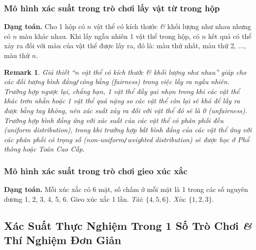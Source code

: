 \documentclass{article}
\numberwithin{equation}{section}
\newtheorem{remark}{Remark}[section]
\begin{document}
\subsubsection{Mô hình xác suất trong trò chơi lấy vật từ trong hộp}
\textbf{Dạng toán.} Cho 1 hộp có $n$ vật thể có kích thước \textit{\&} khối lượng như nhau nhưng có $n$ màu khác nhau. Khi lấy ngẫu nhiên 1 vật thể trong hộp, có $n$ kết quả có thể xảy ra đối với màu của vật thể được lấy ra, đó là: màu thứ nhất, màu thứ 2, $\ldots$, màu thứ $n$.

\begin{remark}
	Giả thiết ``$n$ vật thể có kích thước \textit{\&} khối lượng như nhau'' giúp cho các đối tượng bình đẳng\emph{\texttt{/}}công bằng (fairness) trong việc lấy ra ngẫu nhiên. Trường hợp ngược lại, chẳng hạn, 1 vật thể đầy gai nhọn trong khi các vật thể khác trơn nhẵn hoặc 1 vật thể quá nặng so các vật thể còn lại sẽ khó để lấy ra được bằng tay không, nên xác suất xảy ra đối với vật thể đó sẽ là 0 (unfairness). Trường hợp bình đẳng ứng với xác suất của các vật thể có phân phối đều (uniform distribution), trong khi trường hợp bất bình đẳng của các vật thể ứng với các phân phối có trọng số (non-uniform\emph{\texttt{/}}weighted distribution) sẽ được học ở Phổ thông hoặc Toán Cao Cấp.
\end{remark}

\subsubsection{Mô hình xác suất trong trò chơi gieo xúc xắc}
\textbf{Dạng toán.} Mỗi xúc xắc có 6 mặt, số chấm ở mỗi mặt là 1 trong các số nguyên dương 1, 2, 3, 4, 5, 6. Gieo xúc xắc 1 lần. \textit{Tài}: $\{4,5,6\}$. \textit{Xỉu}: $\{1,2,3\}$.

\subsection{Xác Suất Thực Nghiệm Trong 1 Số Trò Chơi \textit{\&} Thí Nghiệm Đơn Giản}
\end{document}

